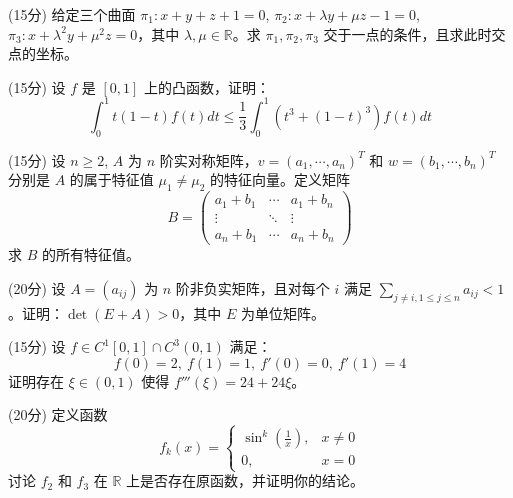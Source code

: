 \documentclass[loose]{ExBook}
\begin{document}
\begin{qitems}

    \begin{bbox}
        \qitem (15分) 给定三个曲面 \(\pi_1 : x + y + z + 1 = 0\), \(\pi_2 : x + \lambda y + \mu z - 1 = 0\), \(\pi_3 : x + \lambda^2 y + \mu^2 z = 0\)，其中 \(\lambda, \mu \in \mathbb{R}\)。求 \(\pi_1, \pi_2, \pi_3\) 交于一点的条件，且求此时交点的坐标。
    \end{bbox}

    \begin{bbox}
        \qitem (15分) 设 \(f\) 是 \([0,1]\) 上的凸函数，证明：
        \[
        \int_{0}^{1} t(1-t)f(t)dt \leq \frac{1}{3}\int_{0}^{1}(t^3+(1-t)^3)f(t)dt
        \]
    \end{bbox}

    \begin{bbox}
        \qitem (15分) 设 \(n \geq 2\), \(A\) 为 \(n\) 阶实对称矩阵，\(v = (a_1,\cdots,a_n)^T\) 和 \(w = (b_1,\cdots,b_n)^T\) 分别是 \(A\) 的属于特征值 \(\mu_1 \neq \mu_2\) 的特征向量。定义矩阵
        \[
        B = \begin{pmatrix}
        a_1+b_1 & \cdots & a_1+b_n \\
        \vdots & \ddots & \vdots \\
        a_n+b_1 & \cdots & a_n+b_n 
        \end{pmatrix}
        \]
        求 \(B\) 的所有特征值。
    \end{bbox}

    \begin{bbox}
        \qitem (20分) 设 \(A = (a_{ij})\) 为 \(n\) 阶非负实矩阵，且对每个 \(i\) 满足 \(\sum\limits_{j\neq i,1\leqslant j\leqslant n}a_{ij} < 1\)。证明：\(\det(E+A) > 0\)，其中 \(E\) 为单位矩阵。
    \end{bbox}

    \begin{bbox}
        \qitem (15分) 设 \(f \in C^1[0,1] \cap C^3(0,1)\) 满足：
        \[
        f(0)=2,\ f(1)=1,\ f'(0)=0,\ f'(1)=4
        \]
        证明存在 \(\xi \in (0,1)\) 使得 \(f'''(\xi) = 24 + 24\xi\)。
    \end{bbox}

    \begin{bbox}
        \qitem (20分) 定义函数
        \[
        f_k(x) = \begin{cases}
        \sin^k(\frac{1}{x}), & x \neq 0 \\
        0, & x = 0
        \end{cases}
        \]
        讨论 \(f_2\) 和 \(f_3\) 在 \(\mathbb{R}\) 上是否存在原函数，并证明你的结论。
    \end{bbox}

\end{qitems}
\end{document}
